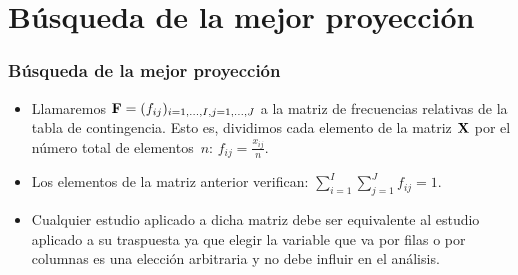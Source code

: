 \section{Búsqueda de la mejor proyección}
\begin{frame}
\frametitle{Búsqueda de la mejor proyección}
\begin{itemize}
\item<2->{Llamaremos $\mathbf{F}=(f_{ij})_{i=1,\ldots,I,j=1,\ldots,J}$ a la matriz de frecuencias relativas de la tabla de contingencia. Esto es, dividimos cada elemento de la matriz $\mathbf{X}$ por el número total de elementos~$n$: $f_{ij}=\frac{x_{ij}}{n}$.}
\item<3->{Los elementos de la matriz anterior verifican: $\sum\limits_{i=1}^I\sum\limits_{j=1}^J f_{ij}=1.$}
\item<4->{Cualquier estudio aplicado a dicha matriz debe ser equivalente al estudio aplicado a su traspuesta ya que elegir la variable que va por filas o por columnas es una elección arbitraria y no debe influir en el análisis.}
\end{itemize}
\end{frame}
